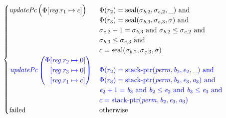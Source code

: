 \documentclass[a4paper]{article}
\begin{document}
\begin{align*}
\begin{cases}
                                \updPcAddr{}\left(
                                \arraycolsep=0pt
                                \begin{array}{r l}
                                  \Phi&\updReg{r_1}{c}
                                \end{array}\right)
&
                                \arraycolsep=0pt
                                \begin{array}[t]{l}
                                  \Phi(r_2) = \seal{\sigma_{\baddr,2},\sigma_{\eaddr,2},\_} \tand \\
                                  \Phi(r_3) = \seal{\sigma_{\baddr,3},\sigma_{\eaddr,3},\sigma} \tand \\
                                  \sigma_{\eaddr,2}+1 = \sigma_{\baddr,3} \tand \sigma_{\baddr,2} \leq \sigma_{\eaddr,2} \tand\\
                                  \sigma_{\baddr,3} \leq \sigma_{\eaddr,3} \tand \\
                                  c = \seal{\sigma_{\baddr,2},\sigma_{\eaddr,3},\sigma}
                                \end{array}\\
                                \sourcecolor\left.
                                \updPcAddr{}\left(
                                \arraycolsep=0pt
                                \begin{array}{r l}
                                  \Phi&\updReg{r_2}{0}\\
                                      &\updReg{r_3}{0}\\
                                      &\updReg{r_1}{c}
                                \end{array}\right)\right.
&
                                \sourcecolor
                                \arraycolsep=0pt
                                \begin{array}[t]{l}
                                  \Phi(r_2) = \stkptr{\perm,\baddr_2,\eaddr_2,\_} \tand \\
                                  \Phi(r_3) = \stkptr{\perm,\baddr_3,\eaddr_3,\aaddr_3} \tand \\
                                  \eaddr_2 + 1 = \baddr_3 \tand \baddr_2 \leq \eaddr_2 \tand \baddr_3 \leq \eaddr_3 \tand \\
                                  c = \stkptr{\perm,\baddr_2,\eaddr_3,\aaddr_3} \\
                                \end{array}\\
                                \failed & \totherwise
                              \end{cases}
\end{align*}
\end{document}
